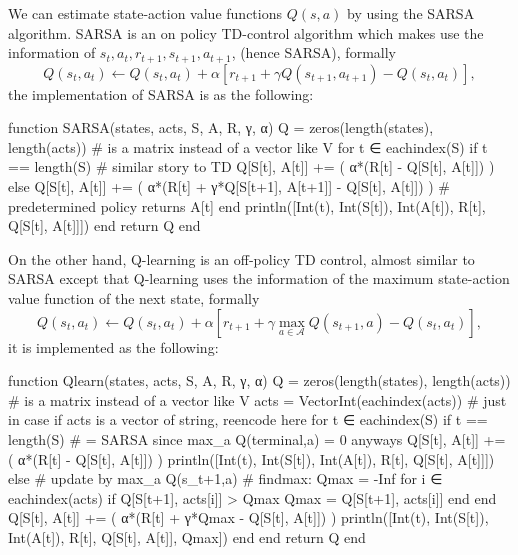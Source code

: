 \documentclass[12pt]{article}
\begin{document}
We can estimate state-action value functions $Q(s,a)$ by using the SARSA algorithm. SARSA is an on policy TD-control algorithm which makes use the information of $s_t,a_t,r_{t+1},s_{t+1},a_{t+1}$, (hence SARSA), formally
\begin{equation}
    Q(s_t,a_t) \leftarrow Q(s_t, a_t) + \alpha[r_{t+1} + \gamma Q(s_{t+1}, a_{t+1}) - Q(s_t, a_t)],
\end{equation}
the implementation of SARSA is as the following:
\begin{jllisting}
    function SARSA(states, acts, S, A, R, γ, α)
        Q = zeros(length(states), length(acts)) # is a matrix instead of a vector like V
        for t ∈ eachindex(S)
            if t == length(S) # similar story to TD
                Q[S[t], A[t]] += ( α*(R[t] - Q[S[t], A[t]]) )
            else
                Q[S[t], A[t]] += ( α*(R[t] + γ*Q[S[t+1], A[t+1]] - Q[S[t], A[t]]) ) # predetermined policy returns A[t]
            end
            println([Int(t), Int(S[t]), Int(A[t]), R[t], Q[S[t], A[t]]])
        end
        return Q
    end
\end{jllisting}
On the other hand, Q-learning is an off-policy TD control, almost similar to SARSA except that Q-learning uses the information of the maximum state-action value function of the next state, formally
\begin{equation}
    Q(s_t,a_t) \leftarrow Q(s_t, a_t) + \alpha[r_{t+1} + \gamma \max_{a\in\mathcal{A}}Q(s_{t+1}, a) - Q(s_t, a_t)],
\end{equation}
it is implemented as the following:
\begin{jllisting}
    function Qlearn(states, acts, S, A, R, γ, α)
        Q = zeros(length(states), length(acts)) # is a matrix instead of a vector like V
        acts = Vector{Int}(eachindex(acts)) # just in case if acts is a vector of string, reencode here
        for t ∈ eachindex(S)
            if t == length(S) # = SARSA since max_a Q(terminal,a) = 0 anyways
                Q[S[t], A[t]] += ( α*(R[t] - Q[S[t], A[t]]) )
                println([Int(t), Int(S[t]), Int(A[t]), R[t], Q[S[t], A[t]]])
            else # update by max_a Q(s_t+1,a)
                # findmax:
                Qmax = -Inf
                for i ∈ eachindex(acts)
                    if Q[S[t+1], acts[i]] > Qmax
                        Qmax = Q[S[t+1], acts[i]]
                    end
                end
                Q[S[t], A[t]] += ( α*(R[t] + γ*Qmax - Q[S[t], A[t]]) ) 
                println([Int(t), Int(S[t]), Int(A[t]), R[t], Q[S[t], A[t]], Qmax])
            end
        end
        return Q
    end
\end{jllisting}
\end{document}
